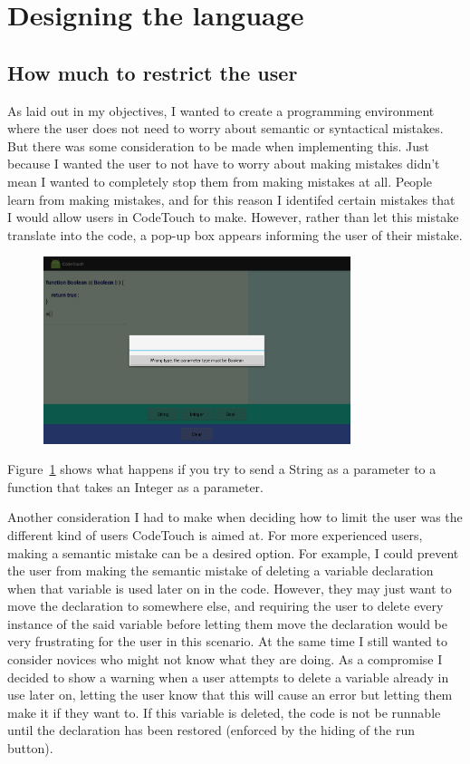 \documentclass[ %
                    author={Jonathan Rankin},
                supervisor={Dr. David May, Dr. Ian Holyer},
                    degree={MEng},
                     title={CodeTouch},
                  subtitle={A Revolutionary Way To Program Real Code On Touch Screen Devices},
                      type={enterprise},
                      year={2015 } ]{dissertation}
\begin{document}
\section{Designing the language}

\subsection{How much to restrict the user}
As laid out in my objectives, I wanted to create a programming environment where the user does not need to worry about semantic or syntactical mistakes. But there was some consideration to be made when implementing this. Just because I wanted the user to not have to worry about making mistakes didn't mean I wanted to completely stop them from making mistakes at all. People learn from making mistakes, and for this reason I identifed certain mistakes that I would allow users in CodeTouch to make. However, rather than let this mistake translate into the code, a pop-up box appears informing the user of their mistake.

\begin{figure}[h]
\centering
\includegraphics[width=0.80\textwidth]{boolmistake}
\caption{}
\label{fig:boolmistake}
\end{figure}

Figure~\ref{fig:boolmistake} shows what happens if you try to send a String as a parameter to a function that takes an Integer as a parameter. 

Another consideration I had to make when deciding how to limit the user was the different kind of users CodeTouch is aimed at. For more experienced users, making a semantic mistake can be a desired option. For example, I could prevent the user from making the semantic mistake of deleting a variable declaration when that variable is used later on in the code. However, they may just want to move the declaration to somewhere else, and requiring the user to delete every instance of the said variable before letting them move the declaration would be very frustrating for the user in this scenario. At the same time I still wanted to consider novices who might not know what they are doing. As a compromise I decided to show a warning when a user attempts to delete a variable already in use later on, letting the user know that this will cause an error but letting them make it if they want to. If this variable is deleted, the code is not be runnable until the declaration has been restored (enforced by the hiding of the run button).
\end{document}

